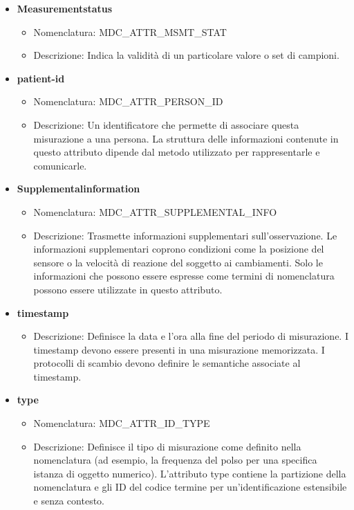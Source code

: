 \documentclass[a4paper]{article}
\begin{document}
\begin{itemize}
\begin{itemize}
        \end{itemize}
    \item \textbf{Measurementstatus}
        \begin{itemize}
            \item Nomenclatura:  MDC\_ATTR\_MSMT\_STAT
            \item Descrizione: Indica la validità di un particolare valore o set di campioni.
        \end{itemize}  
    \item \textbf{patient-id}
        \begin{itemize}
            \item Nomenclatura:  MDC\_ATTR\_PERSON\_ID
            \item Descrizione: Un identificatore che permette di associare questa misurazione a una persona. La struttura delle informazioni contenute in questo attributo dipende dal metodo utilizzato per rappresentarle e comunicarle.
        \end{itemize} 
    \item \textbf{Supplementalinformation}
        \begin{itemize}
            \item Nomenclatura:  MDC\_ATTR\_SUPPLEMENTAL\_INFO
            \item Descrizione: Trasmette informazioni supplementari sull'osservazione. Le informazioni supplementari coprono condizioni come la posizione del sensore o la velocità di reazione del soggetto ai cambiamenti. Solo le informazioni che possono essere espresse come termini di nomenclatura possono essere utilizzate in questo attributo.
        \end{itemize} 
    \item \textbf{timestamp}
        \begin{itemize}
            \item Descrizione: Definisce la data e l'ora alla fine del periodo di misurazione. I timestamp devono essere presenti in una misurazione memorizzata. I protocolli di scambio devono definire le semantiche associate al timestamp.
        \end{itemize}
    \item \textbf{type}
        \begin{itemize}
            \item Nomenclatura:  MDC\_ATTR\_ID\_TYPE
            \item Descrizione: Definisce il tipo di misurazione come definito nella nomenclatura (ad esempio, la frequenza del polso per una specifica istanza di oggetto numerico). L'attributo type contiene la partizione della nomenclatura e gli ID del codice termine per un'identificazione estensibile e senza contesto.
        \end{itemize} 
\end{itemize}
\end{document}
